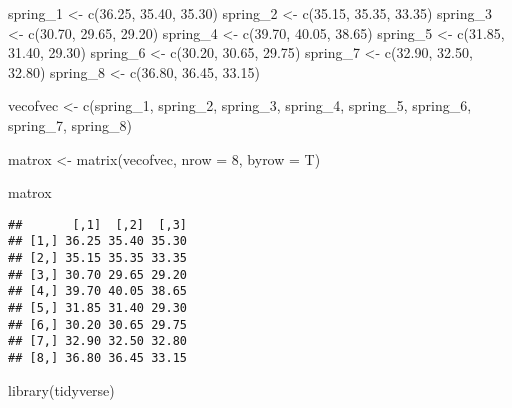\documentclass[
]{article}
\newenvironment{Shaded}{\begin{snugshade}}{\end{snugshade}}
\newcommand{\AttributeTok}[1]{\textcolor[rgb]{0.77,0.63,0.00}{#1}}
\newcommand{\DecValTok}[1]{\textcolor[rgb]{0.00,0.00,0.81}{#1}}
\newcommand{\FloatTok}[1]{\textcolor[rgb]{0.00,0.00,0.81}{#1}}
\newcommand{\FunctionTok}[1]{\textcolor[rgb]{0.00,0.00,0.00}{#1}}
\newcommand{\NormalTok}[1]{#1}
\newcommand{\OtherTok}[1]{\textcolor[rgb]{0.56,0.35,0.01}{#1}}
\begin{document}
\begin{Shaded}
\begin{Highlighting}[]
\NormalTok{spring\_1 }\OtherTok{\textless{}{-}} \FunctionTok{c}\NormalTok{(}\FloatTok{36.25}\NormalTok{, }\FloatTok{35.40}\NormalTok{, }\FloatTok{35.30}\NormalTok{)}
\NormalTok{spring\_2 }\OtherTok{\textless{}{-}} \FunctionTok{c}\NormalTok{(}\FloatTok{35.15}\NormalTok{, }\FloatTok{35.35}\NormalTok{, }\FloatTok{33.35}\NormalTok{)}
\NormalTok{spring\_3 }\OtherTok{\textless{}{-}} \FunctionTok{c}\NormalTok{(}\FloatTok{30.70}\NormalTok{, }\FloatTok{29.65}\NormalTok{, }\FloatTok{29.20}\NormalTok{)}
\NormalTok{spring\_4 }\OtherTok{\textless{}{-}} \FunctionTok{c}\NormalTok{(}\FloatTok{39.70}\NormalTok{, }\FloatTok{40.05}\NormalTok{, }\FloatTok{38.65}\NormalTok{)}
\NormalTok{spring\_5 }\OtherTok{\textless{}{-}} \FunctionTok{c}\NormalTok{(}\FloatTok{31.85}\NormalTok{, }\FloatTok{31.40}\NormalTok{, }\FloatTok{29.30}\NormalTok{)}
\NormalTok{spring\_6 }\OtherTok{\textless{}{-}} \FunctionTok{c}\NormalTok{(}\FloatTok{30.20}\NormalTok{, }\FloatTok{30.65}\NormalTok{, }\FloatTok{29.75}\NormalTok{)}
\NormalTok{spring\_7 }\OtherTok{\textless{}{-}} \FunctionTok{c}\NormalTok{(}\FloatTok{32.90}\NormalTok{, }\FloatTok{32.50}\NormalTok{, }\FloatTok{32.80}\NormalTok{)}
\NormalTok{spring\_8 }\OtherTok{\textless{}{-}} \FunctionTok{c}\NormalTok{(}\FloatTok{36.80}\NormalTok{, }\FloatTok{36.45}\NormalTok{, }\FloatTok{33.15}\NormalTok{)}

\NormalTok{vecofvec }\OtherTok{\textless{}{-}} \FunctionTok{c}\NormalTok{(spring\_1, spring\_2, spring\_3, spring\_4, spring\_5, spring\_6, spring\_7, spring\_8)}

\NormalTok{matrox }\OtherTok{\textless{}{-}} \FunctionTok{matrix}\NormalTok{(vecofvec, }\AttributeTok{nrow =} \DecValTok{8}\NormalTok{, }\AttributeTok{byrow =}\NormalTok{ T)}

\NormalTok{matrox}
\end{Highlighting}
\end{Shaded}

\begin{verbatim}
##       [,1]  [,2]  [,3]
## [1,] 36.25 35.40 35.30
## [2,] 35.15 35.35 33.35
## [3,] 30.70 29.65 29.20
## [4,] 39.70 40.05 38.65
## [5,] 31.85 31.40 29.30
## [6,] 30.20 30.65 29.75
## [7,] 32.90 32.50 32.80
## [8,] 36.80 36.45 33.15
\end{verbatim}

\begin{Shaded}
\begin{Highlighting}[]
\FunctionTok{library}\NormalTok{(tidyverse)}
\end{Highlighting}
\end{Shaded}
\end{document}
